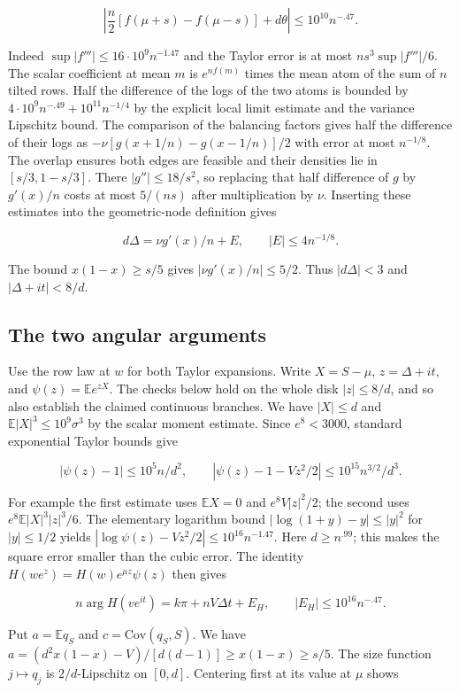 \documentclass[11pt]{article}
\begin{document}
\[
\left|\frac n2[f(\mu+s)-f(\mu-s)]+d\theta\right|
\le 10^{10}n^{-.47}.
\]

Indeed $\sup|f'''|\le16\cdot10^9 n^{-1.47}$
and the Taylor error is at most $ns^3\sup|f'''|/6$.
The scalar coefficient at mean $m$ is $e^{nf(m)}$ times the
mean atom of the sum of $n$ tilted rows. Half the difference of the
logs of the two atoms is bounded by
$4\cdot10^9 n^{-.49}+10^{11}n^{-1/4}$
by the explicit local limit estimate and the variance Lipschitz bound.
The comparison of the balancing factors gives half the difference
of their logs as $-\nu[g(x+1/n)-g(x-1/n)]/2$ with error
at most $n^{-1/8}$. The overlap ensures both edges are feasible and
their densities lie in $[s/3,1-s/3]$. There $|g''|\le18/s^2$,
so replacing that half difference of $g$ by $g'(x)/n$
costs at most $5/(ns)$ after multiplication by $\nu$.
Inserting these estimates into the geometric-node definition gives

\[
d\Delta=\nu g'(x)/n+E,\qquad |E|\le 4n^{-1/8}.
\]

The bound $x(1-x)\ge s/5$ gives $|\nu g'(x)/n|\le5/2$.
Thus $|d\Delta|<3$ and $|\Delta+it|<8/d$.

\subsection{The two angular arguments}

Use the row law at $w$ for both Taylor expansions. Write
$X=S-\mu$, $z=\Delta+it$, and $\psi(z)=\mathbb E e^{zX}$.
The checks below hold on the whole disk $|z|\le8/d$, and so
also establish the claimed continuous branches. We have $|X|\le d$
and $\mathbb E|X|^3\le10^9\sigma^3$ by the scalar moment estimate.
Since $e^8<3000$, standard exponential Taylor bounds give

\[
|\psi(z)-1|\le 10^5 n/d^2,\qquad
|\psi(z)-1-Vz^2/2|\le 10^{15}n^{3/2}/d^3.
\]

For example the first estimate uses
$\mathbb EX=0$ and $e^8V|z|^2/2$; the second uses
$e^8\mathbb E|X|^3|z|^3/6$. The elementary logarithm bound
$|\log(1+y)-y|\le |y|^2$ for $|y|\le1/2$ yields
$|\log\psi(z)-Vz^2/2|\le 10^{16} n^{-1.47}$.
Here $d\ge n^{.99}$; this makes the square error smaller than the
cubic error. The identity
$H(we^z)=H(w)e^{\mu z}\psi(z)$ then gives

\[
n\arg H(ve^{it})=k\pi+nV\Delta t+E_H,\qquad
|E_H|\le10^{16} n^{-.47}.
\]

Put $a=\mathbb E q_S$ and $c=\mathrm{Cov}(q_S,S)$.
We have $a=(d^2x(1-x)-V)/[d(d-1)]\ge x(1-x)\ge s/5$.
The size function $j\mapsto q_j$ is $2/d$-Lipschitz on $[0,d]$.
Centering first at its value at $\mu$ shows
\end{document}

